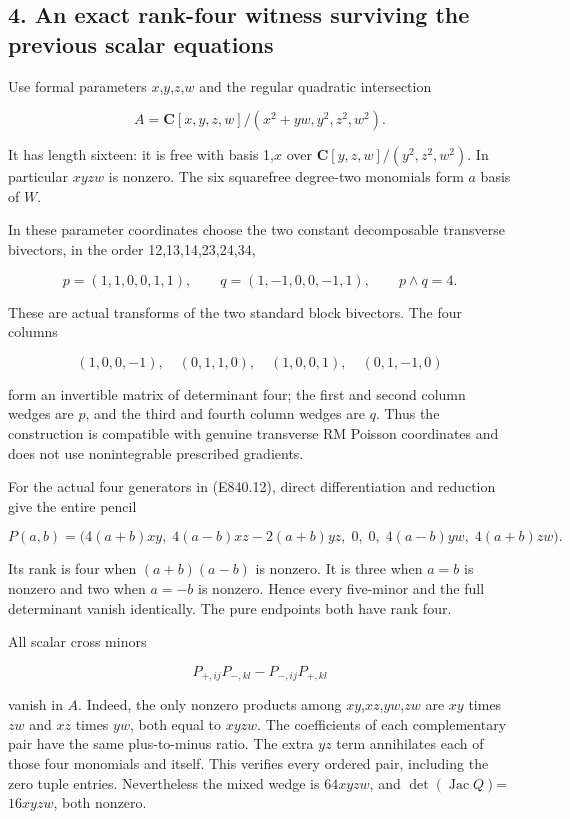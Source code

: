 \subsection{4. An exact rank-four witness surviving the previous scalar
equations}\label{SF-E840:an-exact-rank-four-witness-surviving-the-previous-scalar-equations}

Use formal parameters \(x\),\(y\),\(z\),\(w\) and the regular quadratic
intersection

\[
 A=\mathbf C[x,y,z,w]/(x^2+yw,y^2,z^2,w^2).
 \tag{E840.12}
\]

It has length sixteen: it is free with basis 1,\(x\) over
\(\mathbf C[y,z,w]/(y^2,z^2,w^2)\). In particular \(xyzw\) is nonzero.
The six squarefree degree-two monomials form \(a\) basis of \(W\).

In these parameter coordinates choose the two constant decomposable
transverse bivectors, in the order 12,13,14,23,24,34,

\[
 p=(1,1,0,0,1,1),\qquad
 q=(1,-1,0,0,-1,1),\qquad p\wedge q=4.
 \tag{E840.13}
\]

These are actual transforms of the two standard block bivectors. The
four columns

\[
 (1,0,0,-1),\quad(0,1,1,0),\quad
 (1,0,0,1),\quad(0,1,-1,0)
 \tag{E840.14}
\]

form an invertible matrix of determinant four; the first and second
column wedges are \(p\), and the third and fourth column wedges are
\(q\). Thus the construction is compatible with genuine transverse RM
Poisson coordinates and does not use nonintegrable prescribed gradients.

For the actual four generators in (E840.12), direct differentiation and
reduction give the entire pencil

\[
 P(a,b)=\bigl(4(a+b)xy,\;
 4(a-b)xz-2(a+b)yz,\;0,\;0,\;
 4(a-b)yw,\;4(a+b)zw\bigr).
 \tag{E840.15}
\]

Its rank is four when \((a+b)(a-b)\) is nonzero. It is three when
\(a=b\) is nonzero and two when \(a=-b\) is nonzero. Hence every
five-minor and the full determinant vanish identically. The pure
endpoints both have rank four.

All scalar cross minors

\[
             P_{+,ij}P_{-,kl}-P_{-,ij}P_{+,kl}
 \tag{E840.16}
\]

vanish in \(A\). Indeed, the only nonzero products among
\(xy\),\(xz\),\(yw\),\(zw\) are \(xy\) times \(zw\) and \(xz\) times
\(yw\), both equal to \(xyzw\). The coefficients of each complementary
pair have the same plus-to-minus ratio. The extra \(yz\) term
annihilates each of those four monomials and itself. This verifies every
ordered pair, including the zero tuple entries. Nevertheless the mixed
wedge is \(64xyzw\), and \(\det(\operatorname{Jac}Q)\)=\(16xyzw\), both
nonzero.

